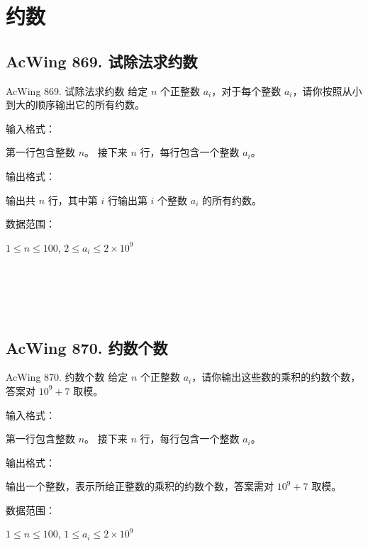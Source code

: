 \section{约数}

\subsection{AcWing 869. 试除法求约数}
\begin{titledbox}{AcWing 869. 试除法求约数}
给定 $n$ 个正整数 $a_i$，对于每个整数 $a_i$，请你按照从小到大的顺序输出它的所有约数。

输入格式：

第一行包含整数 $n$。 接下来 $n$ 行，每行包含一个整数 $a_i$。

输出格式：

输出共 $n$ 行，其中第 $i$ 行输出第 $i$ 个整数 $a_i$ 的所有约数。

数据范围：

$1 \le n \le 100$, $2 \le a_i \le 2 \times 10^9$

\begin{inputblock}
 \\
 \\
\end{inputblock}
\begin{outputblock}
 \\
\end{outputblock}
\end{titledbox}

\subsection{AcWing 870. 约数个数}

\begin{titledbox}{AcWing 870. 约数个数}
给定 $n$ 个正整数 $a_i$，请你输出这些数的乘积的约数个数，答案对 $10^9+7$ 取模。

输入格式：

第一行包含整数 $n$。 接下来 $n$ 行，每行包含一个整数 $a_i$。

输出格式：

输出一个整数，表示所给正整数的乘积的约数个数，答案需对 $10^9+7$ 取模。

数据范围：

$1 \le n \le 100$, $1 \le a_i \le 2 \times 10^9$

\begin{inputblock}
 \\
 \\
 \\
\end{inputblock}
\begin{outputblock}
\end{outputblock}
\end{titledbox}

